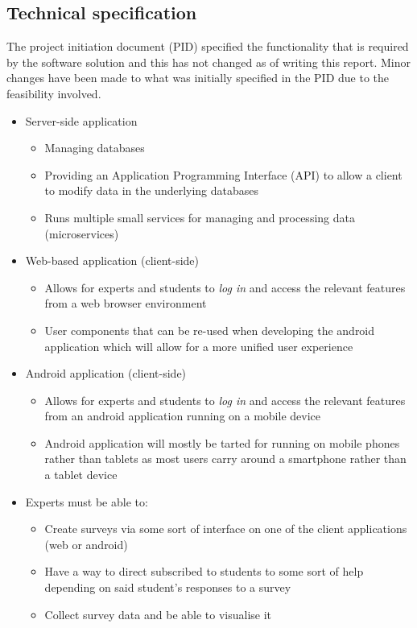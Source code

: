 \subsection{Technical specification}
The project initiation document (PID) specified the functionality that is required by the software solution and this has not changed as of writing this report.
Minor changes have been made to what was initially specified in the PID due to the feasibility involved.

\begin{itemize}
    \tightlist
    \item Server-side application
    \begin{itemize}
        \item Managing databases
        \item Providing an Application Programming Interface (API) to allow a client to modify data in the underlying databases
        \item Runs multiple small services for managing and processing data (microservices)
    \end{itemize}

    \item Web-based application (client-side)
    \begin{itemize}
        \item Allows for experts and students to \emph{log in} and access the relevant features from a web browser environment
        \item User components that can be re-used when developing the android application which will allow for a more unified user experience
    \end{itemize}

    \item Android application (client-side)
    \begin{itemize}
        \item Allows for experts and students to \emph{log in} and access the relevant features from an android application running on a mobile device 
        \item Android application will mostly be tarted for running on mobile phones rather than tablets as most users carry around a smartphone rather than a tablet device
    \end{itemize}

    \item Experts must be able to:
    \begin{itemize}
        \item Create surveys via some sort of interface on one of the client applications (web or android)
        \item Have a way to direct subscribed to students to some sort of help depending on said student's responses to a survey 
        \item Collect survey data and be able to visualise it 
    \end{itemize}
\end{itemize}

